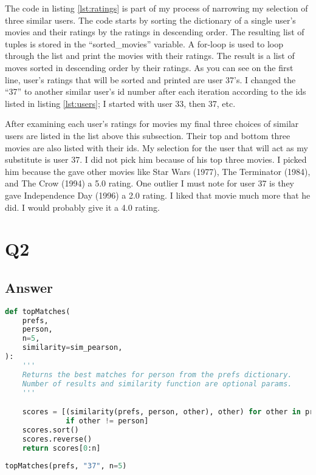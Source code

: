 \documentclass[12pt]{article}
\begin{document}
The code in listing \ref{lst:ratings} is part of my process of narrowing my selection of three similar users.  The code starts by sorting the dictionary of a single user's movies and their ratings by the ratings in descending order.  The resulting list of tuples is stored in the ``sorted\_movies'' variable.  A for-loop is used to loop through the list and print the movies with their ratings.  The result is a list of moves sorted in descending order by their ratings.  As you can see on the first line, user's ratings that will be sorted and printed are user 37's.  I changed the ``37'' to another similar user's id number after each iteration according to the ids listed in listing \ref{lst:users}; I started with user 33, then 37, etc.

After examining each user's ratings for movies my final three choices of similar users are listed in the list above this subsection.  Their top and bottom three movies are also listed with their ids.  My selection for the user that will act as my substitute is user 37.  I did not pick him because of his top three movies.  I picked him because the gave other movies like Star Wars (1977), The Terminator (1984), and The Crow (1994) a 5.0 rating.  One outlier I must note for user 37 is they gave Independence Day (1996) a 2.0 rating.  I liked that movie much more that he did.  I would probably give it a 4.0 rating.

\section*{Q2}

\subsection*{Answer}

\begin{lstlisting}[language=Python, caption=topMatches function copy-pasted from the week-11 Colab notebook with the function call at the bottom., label=lst:matches]
def topMatches(
    prefs,
    person,
    n=5,
    similarity=sim_pearson,
):
    '''
    Returns the best matches for person from the prefs dictionary. 
    Number of results and similarity function are optional params.
    '''

    scores = [(similarity(prefs, person, other), other) for other in prefs
              if other != person]
    scores.sort()
    scores.reverse()
    return scores[0:n]
    
topMatches(prefs, "37", n=5)
\end{lstlisting}
\end{document}
